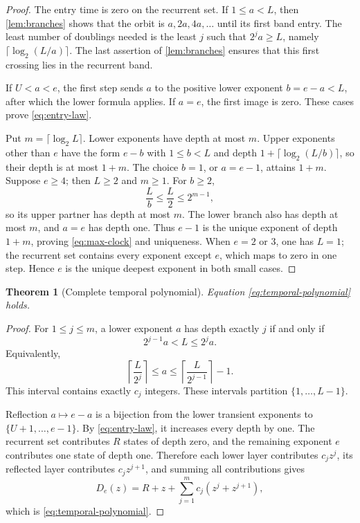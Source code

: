 \documentclass[10pt,a4paper]{amsart}
\newtheorem{theorem}{Theorem}[section]
\theoremstyle{definition}
\theoremstyle{remark}
\begin{document}
\begin{proof}
The entry time is zero on the recurrent set.  If $1\leq a<L$, then
\cref{lem:branches} shows that the orbit is
$a,2a,4a,\ldots$ until its first band entry.  The least number of doublings
needed is the least $j$ such that $2^ja\geq L$, namely
$\lceil\log_2(L/a)\rceil$.  The last assertion of \cref{lem:branches}
ensures that this first crossing lies in the recurrent band.

If $U<a<e$, the first step sends $a$ to the positive lower exponent
$b=e-a<L$, after which the lower formula applies.  If $a=e$, the first image
is zero.  These cases prove \eqref{eq:entry-law}.

Put $m=\lceil\log_2L\rceil$.  Lower exponents have depth at most $m$.
Upper exponents other than $e$ have the form $e-b$ with $1\leq b<L$ and
depth $1+\lceil\log_2(L/b)\rceil$, so their depth is at most $1+m$.  The
choice $b=1$, or $a=e-1$, attains $1+m$.  Suppose $e\geq4$; then $L\geq2$
and $m\geq1$.  For $b\geq2$,
\[
 \frac Lb\leq\frac L2\leq2^{m-1},
\]
so its upper partner has depth at most $m$.  The lower branch also has depth
at most $m$, and $a=e$ has depth one.  Thus $e-1$ is the unique exponent of
depth $1+m$, proving \eqref{eq:max-clock} and uniqueness.  When $e=2$ or
$3$, one has $L=1$; the recurrent set contains every exponent except $e$,
which maps to zero in one step.  Hence $e$ is the unique deepest exponent in
both small cases.
\end{proof}

\begin{theorem}[Complete temporal polynomial]\label{thm:temporal}
Equation \eqref{eq:temporal-polynomial} holds.
\end{theorem}

\begin{proof}
For $1\leq j\leq m$, a lower exponent $a$ has depth exactly $j$ if and only
if
\[
 2^{j-1}a<L\leq2^ja.
\]
Equivalently,
\[
 \left\lceil\frac{L}{2^j}\right\rceil
 \leq a\leq
 \left\lceil\frac{L}{2^{j-1}}\right\rceil-1.
\]
This interval contains exactly $c_j$ integers.  These intervals partition
$\{1,\ldots,L-1\}$.

Reflection $a\mapsto e-a$ is a bijection from the lower transient exponents
to $\{U+1,\ldots,e-1\}$.  By \eqref{eq:entry-law}, it increases every depth
by one.  The recurrent set contributes $R$ states of depth zero, and the
remaining exponent $e$ contributes one state of depth one.  Therefore each
lower layer contributes $c_jz^j$, its reflected layer contributes
$c_jz^{j+1}$, and summing all contributions gives
\[
 D_e(z)=R+z+\sum_{j=1}^{m}c_j(z^j+z^{j+1}),
\]
which is \eqref{eq:temporal-polynomial}.
\end{proof}
\end{document}
